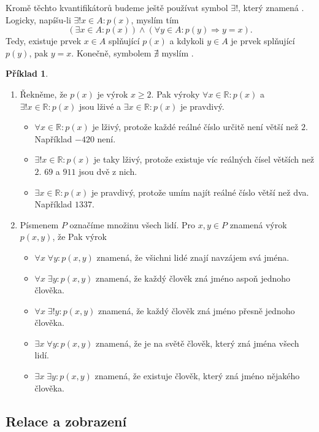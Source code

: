 \documentclass[a4paper,11pt]{article}
\theoremstyle{definition}
\newtheorem{exm}[thm]{Příklad}
\theoremstyle{plain}
\newcommand{\R}{\mathbb{R}}
\begin{document}
Kromě těchto kvantifikátorů budeme ještě používat symbol $ \exists !$, který
znamená . Logicky, napíšu-li $ \exists !x \in A:p(x)$,
myslím tím
\[
 (\exists x \in A:p(x)) \wedge ( \forall y \in A:p(y) \Rightarrow y = x).
\]
Tedy, existuje prvek $x \in A$ splňující $p(x)$ a kdykoli $y \in A$ je prvek
splňující $p(y)$, pak $y = x$. Konečně, symbolem $\nexists$ myslím
.

\begin{exm}\hfill
 \begin{enumerate}
  \item Řekněme, že $p(x)$ je výrok $x \geq 2$. Pak výroky $ \forall x \in
   \R:p(x)$ a $ \exists !x \in \R:p(x)$ jsou lživé a $ \exists x \in \R:p(x)$ je
   pravdivý.
   \begin{itemize}
    \item $ \forall x \in \R:p(x)$ je lživý, protože každé reálné číslo určitě
     není větší než $2$. Například $-420$ není.
    \item $ \exists !x \in \R:p(x)$ je taky lživý, protože existuje víc reálných
     čísel větších než $2$. $69$ a $911$ jsou dvě z nich.
    \item $ \exists x \in \R:p(x)$ je pravdivý, protože umím najít reálné číslo
     větší než dva. Například $1337$.
   \end{itemize}
  \item Písmenem $P$ označíme množinu všech lidí. Pro $x,y \in P$ znamená výrok
   $p(x,y)$, že  Pak výrok
   \begin{itemize}
    \item $ \forall x \; \forall y: p(x,y)$ znamená, že všichni lidé znají
     navzájem svá jména.
    \item $ \forall x \; \exists y: p(x,y)$ znamená, že každý člověk zná jméno
     aspoň jednoho člověka.
    \item $ \forall x \; \exists !y:p(x,y)$ znamená, že každý člověk zná jméno
     přesně jednoho člověka.
    \item $  \exists x \; \forall y :p(x,y)$ znamená, že je na světě člověk,
     který zná jména všech lidí.
    \item $ \exists x \; \exists y: p(x,y)$ znamená, že existuje člověk, který
     zná jméno nějakého člověka.
   \end{itemize}
 \end{enumerate}
\end{exm}

\subsection{Relace a zobrazení}
\label{ssec:relace-a-zobrazeni}
\end{document}
